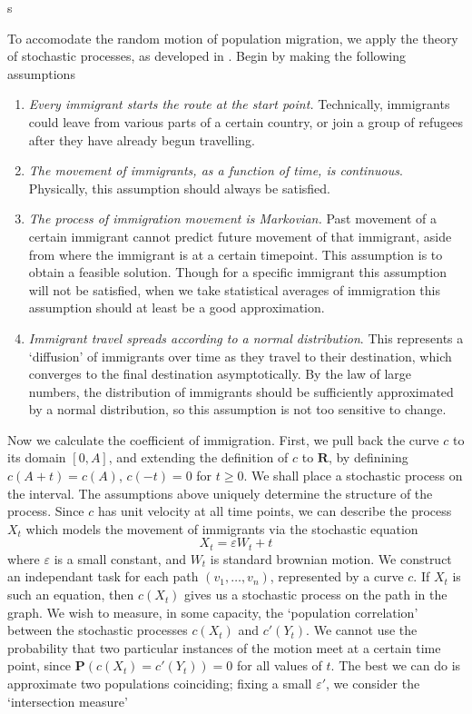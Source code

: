 \documentclass{article}
\begin{document}
\begin{center}
s
\end{center}

To accomodate the random motion of population migration, we apply the theory of stochastic processes, as developed in \cite{lawler}. Begin by making the following assumptions
%
\begin{enumerate}
    \item {\it Every immigrant starts the route at the start point.} Technically, immigrants could leave from various parts of a certain country, or join a group of refugees after they have already begun travelling.
    \item {\it The movement of immigrants, as a function of time, is continuous}. Physically, this assumption should always be satisfied.
    \item {\it The process of immigration movement is Markovian.} Past movement of a certain immigrant cannot predict future movement of that immigrant, aside from where the immigrant is at a certain timepoint. This assumption is to obtain a feasible solution. Though for a specific immigrant this assumption will not be satisfied, when we take statistical averages of immigration this assumption should at least be a good approximation.
    \item {\it Immigrant travel spreads according to a normal distribution}. This represents a `diffusion' of immigrants over time as they travel to their destination, which converges to the final destination asymptotically. By the law of large numbers, the distribution of immigrants should be sufficiently approximated by a normal distribution, so this assumption is not too sensitive to change.
\end{enumerate}
%
Now we calculate the coefficient of immigration. First, we pull back the curve $c$ to its domain $[0,A]$, and extending the definition of $c$ to $\mathbf{R}$, by definining $c(A + t) = c(A)$, $c(-t) = 0$ for $t \geq 0$. We shall place a stochastic process on the interval. The assumptions above uniquely determine the structure of the process. Since $c$ has unit velocity at all time points, we can describe the process $X_t$ which models the movement of immigrants via the stochastic equation
%
\[ X_t = \varepsilon W_t + t \]
%
where $\varepsilon$ is a small constant, and $W_t$ is standard brownian motion. We construct an independant task for each path $(v_1, \dots, v_n)$, represented by a curve $c$. If $X_t$ is such an equation, then $c(X_t)$ gives us a stochastic process on the path in the graph. We wish to measure, in some capacity, the `population correlation' between the stochastic processes $c(X_t)$ and $c'(Y_t)$. We cannot use the probability that two particular instances of the motion meet at a certain time point, since $\mathbf{P}(c(X_t) = c'(Y_t)) = 0$ for all values of $t$. The best we can do is approximate two populations coinciding; fixing a small $\varepsilon'$, we consider the `intersection measure'
\end{document}
